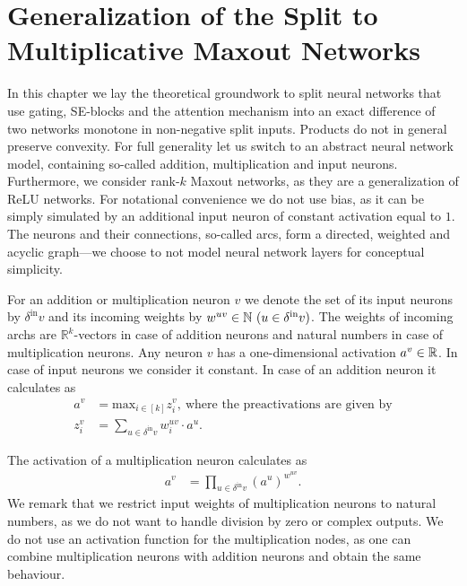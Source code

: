 \section{Generalization of the Split to Multiplicative Maxout Networks} \label{app:splitting_multiplicative_maxout_networks}

In this chapter we lay the theoretical groundwork to split neural networks that use gating, SE-blocks and the attention mechanism into an exact difference of two networks monotone in non-negative split inputs. Products do not in general preserve convexity.
For full generality let us switch to an abstract neural network model, containing so-called addition, multiplication and input neurons.
Furthermore, we consider rank-$k$ Maxout networks, as they are a generalization of ReLU networks.
For notational convenience we do not use bias, as it can be simply simulated by an additional input neuron of constant activation equal to $1$.
The neurons and their connections, so-called arcs, form a directed, weighted and acyclic graph---we choose to not model neural network layers for conceptual simplicity.

For an addition or multiplication neuron $v$ we denote the set of its input neurons by $\delta^{\text{in}}v$ and its incoming weights by $w^{uv} \in \NN \ (u \in \delta^{\text{in}}v)$.
The weights of incoming archs are $\mathbb{R}^k$-vectors in case of addition neurons and natural numbers in case of multiplication neurons.
Any neuron $v$ has a one-dimensional activation $a^v \in \mathbb{R}$. In case of input neurons we consider it constant. In case of an addition neuron it calculates as
\begin{align}
    a^v &= \text{max}_{i \in [k]} z^v_i, \ \text{where the preactivations are given by} \label{eq:addition_neuron_activation}\\
    z^v_i &= \sum_{u \in \delta^{\text{in}}v} w_i^{uv} \cdot a^u. \label{eq:addition_neuron_input_activation}
\end{align}

The activation of a multiplication neuron calculates as
\begin{align}
    a^v &= \prod_{u \in \delta^{\text{in}}v} \left( a^u \right) ^ {w^{uv}}. \label{eq:multiplication_neuron_activation}
\end{align}
We remark that we restrict input weights of multiplication neurons to natural numbers, as we do not want to handle division by zero or complex outputs.
We do not use an activation function for the multiplication nodes, as one can combine multiplication neurons with addition neurons and obtain the same behaviour.

